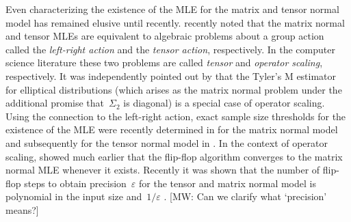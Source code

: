 \documentclass[aos]{imsart}
\theoremstyle{definition}
\newcommand{\eps}{\varepsilon}
\newcommand{\CF}[1]{{\color{purple}[CF: #1]}}
\newcommand{\MW}[1]{{\color{red}[MW: #1]}}
\begin{document}
Even characterizing the existence of the MLE for the matrix and tensor normal model has remained elusive until recently.
\cite{amendola2020invariant} recently noted that the matrix normal and tensor MLEs are equivalent to algebraic problems about a group action called the \emph{left-right action} and the \emph{tensor action}, respectively.
In the computer science literature these two problems are called \emph{tensor} and \emph{operator scaling}, respectively.
It was independently pointed out by \cite{FM20} that the Tyler's M estimator for elliptical distributions (which arises as the matrix normal problem under the additional promise that~$\Sigma_2$ is diagonal) is a special case of operator scaling.
Using the connection to the left-right action, exact sample size thresholds for the existence of the MLE were recently determined in \cite{derksen2020matrix} for the matrix normal model and subsequently for the tensor normal model in \cite{derksen2020tensor}.
In the context of operator scaling, \cite{gurvits2004classical} showed much earlier that the flip-flop algorithm converges to the matrix normal MLE whenever it exists.
Recently it was shown that the number of flip-flop steps to obtain precision~$\eps$ for the tensor and matrix normal model is polynomial in the input size and~$1/\eps$ \citep{GGOW19,burgisser2017alternating,burgisser2019towards}.
\MW{Can we clarify what `precision' means?}


\end{document}
